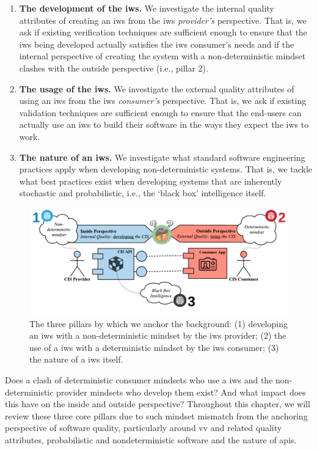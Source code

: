 \begin{enumerate}[label=\textbf{(\arabic*})]
\item \textbf{The development of the \gls{iws}.} We investigate the internal quality attributes of creating an \gls{iws} from the \gls{iws} \textit{provider's} perspective. That is, we ask if existing verification techniques are sufficient enough to ensure that the \gls{iws} being developed actually satisfies the \gls{iws} consumer's needs and if the internal perspective of creating the system with a non-deterministic mindset clashes with the outside perspective (i.e., pillar 2).
\item \textbf{The usage of the \gls{iws}.} We investigate the external quality attributes of using an \gls{iws} from the \gls{iws} \textit{consumer's} perspective. That is, we ask if existing validation techniques are sufficient enough to ensure that the end-users can actually use an \gls{iws} to build their software in the ways they expect the \gls{iws} to work.
\item \textbf{The nature of an \gls{iws}.} We investigate what standard software engineering practices apply when developing non-deterministic systems. That is, we tackle what best practices exist when developing systems that are inherently stochastic and probabilistic, i.e., the `black box' intelligence itself.
\end{enumerate}

\begin{figure}[hbt]
  \centering
  \includegraphics[width=\linewidth]{iws-mindset-clash-pillars}
  \caption[Mindset clashes within the development, use and nature of a IWS]{The three pillars by which we anchor the background: (1) developing an \gls{iws} with a non-deterministic mindset by the \gls{iws} provider; (2) the use of a \gls{iws} with a deterministic mindset by the \gls{iws} consumer; (3) the nature of a \gls{iws} itself.}
  \label{fig:background:preface:iws-mindset-clash-pillars}
\end{figure}

Does a clash of deterministic consumer mindsets who use a \gls{iws} and the non-deterministic provider mindsets who develop them exist? And what impact does this have on the inside and outside perspective? Throughout this chapter, we will review these three core pillars due to such  mindset mismatch from the anchoring perspective of software quality, particularly around \gls{vv} and related quality attributes, probabilistic and nondeterministic software and the nature of \glspl{api}. 




